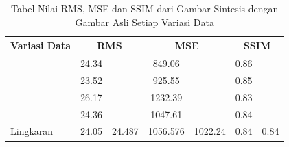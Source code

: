 \documentclass[conference]{IEEEtran}
\begin{document}
\begin{table}[]
  \caption{Tabel Nilai RMS, MSE dan SSIM dari Gambar Sintesis dengan Gambar Asli Setiap Variasi Data}
  \label{tb:evaluasimatriks}
  \begin{tabular}{|l|cc|cc|cc|}
  \hline
  \multicolumn{1}{|c|}{Variasi Data}                  & \multicolumn{2}{c|}{RMS}                                                                               & \multicolumn{2}{c|}{MSE}                                                                                   & \multicolumn{2}{c|}{SSIM}                                                                            \\ \hline
                                                      & \multicolumn{1}{c|}{\cellcolor[HTML]{FFFFFF}24.34} & \cellcolor[HTML]{FFFFFF}                         & \multicolumn{1}{c|}{\cellcolor[HTML]{FFFFFF}849.06}  & \cellcolor[HTML]{FFFFFF}                           & \multicolumn{1}{c|}{\cellcolor[HTML]{FFFFFF}0.86} & \cellcolor[HTML]{FFFFFF}                        \\ \cline{2-2} \cline{4-4} \cline{6-6}
                                                      & \multicolumn{1}{c|}{\cellcolor[HTML]{FFFFFF}23.52} & \cellcolor[HTML]{FFFFFF}                         & \multicolumn{1}{c|}{\cellcolor[HTML]{FFFFFF}925.55}  & \cellcolor[HTML]{FFFFFF}                           & \multicolumn{1}{c|}{\cellcolor[HTML]{FFFFFF}0.85} & \cellcolor[HTML]{FFFFFF}                        \\ \cline{2-2} \cline{4-4} \cline{6-6}
                                                      & \multicolumn{1}{c|}{\cellcolor[HTML]{FFFFFF}26.17} & \cellcolor[HTML]{FFFFFF}                         & \multicolumn{1}{c|}{\cellcolor[HTML]{FFFFFF}1232.39} & \cellcolor[HTML]{FFFFFF}                           & \multicolumn{1}{c|}{\cellcolor[HTML]{FFFFFF}0.83} & \cellcolor[HTML]{FFFFFF}                        \\ \cline{2-2} \cline{4-4} \cline{6-6}
                                                      & \multicolumn{1}{c|}{\cellcolor[HTML]{FFFFFF}24.36} & \cellcolor[HTML]{FFFFFF}                         & \multicolumn{1}{c|}{\cellcolor[HTML]{FFFFFF}1047.61} & \cellcolor[HTML]{FFFFFF}                           & \multicolumn{1}{c|}{\cellcolor[HTML]{FFFFFF}0.84} & \cellcolor[HTML]{FFFFFF}                        \\ \cline{2-2} \cline{4-4} \cline{6-6}
  \multirow{-5}{*}{Lingkaran}          & \multicolumn{1}{c|}{\cellcolor[HTML]{FFFFFF}24.05} & \multirow{-5}{*}{\cellcolor[HTML]{FFFFFF}24.487} & \multicolumn{1}{c|}{\cellcolor[HTML]{FFFFFF}1056.576} & \multirow{-5}{*}{\cellcolor[HTML]{FFFFFF}1022.24} & \multicolumn{1}{c|}{\cellcolor[HTML]{FFFFFF}0.84} & \multirow{-5}{*}{\cellcolor[HTML]{FFFFFF}0.84} \\ \hline

\end{tabular}
\end{table}
\end{document}
